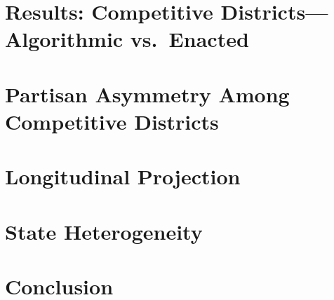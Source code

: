 \documentclass[12pt]{article}
\begin{document}
\section{Results: Competitive Districts---Algorithmic vs.\ Enacted}


\section{Partisan Asymmetry Among Competitive Districts}


\section{Longitudinal Projection}


\section{State Heterogeneity}


\section{Conclusion}




\end{document}
